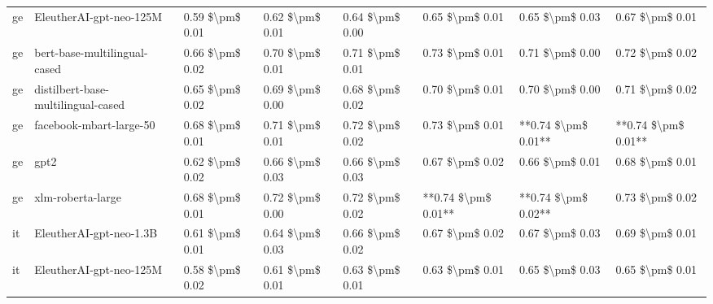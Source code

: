 \begin{tabular}{llllllll}
      ge &            EleutherAI-gpt-neo-125M & 0.59 \$\textbackslash pm\$ 0.01 &           0.62 \$\textbackslash pm\$ 0.01 &       0.64 \$\textbackslash pm\$ 0.00 &        0.65 \$\textbackslash pm\$ 0.01 &                         0.65 \$\textbackslash pm\$ 0.03 &     0.67 \$\textbackslash pm\$ 0.01 \\
      ge &       bert-base-multilingual-cased & 0.66 \$\textbackslash pm\$ 0.02 &           0.70 \$\textbackslash pm\$ 0.01 &       0.71 \$\textbackslash pm\$ 0.01 &        0.73 \$\textbackslash pm\$ 0.01 &                         0.71 \$\textbackslash pm\$ 0.00 &     0.72 \$\textbackslash pm\$ 0.02 \\
      ge & distilbert-base-multilingual-cased & 0.65 \$\textbackslash pm\$ 0.02 &           0.69 \$\textbackslash pm\$ 0.00 &       0.68 \$\textbackslash pm\$ 0.02 &        0.70 \$\textbackslash pm\$ 0.01 &                         0.70 \$\textbackslash pm\$ 0.00 &     0.71 \$\textbackslash pm\$ 0.02 \\
      ge &            facebook-mbart-large-50 & 0.68 \$\textbackslash pm\$ 0.01 &           0.71 \$\textbackslash pm\$ 0.01 &       0.72 \$\textbackslash pm\$ 0.02 &        0.73 \$\textbackslash pm\$ 0.01 &                     **0.74 \$\textbackslash pm\$ 0.01** & **0.74 \$\textbackslash pm\$ 0.01** \\
      ge &                               gpt2 & 0.62 \$\textbackslash pm\$ 0.02 &           0.66 \$\textbackslash pm\$ 0.03 &       0.66 \$\textbackslash pm\$ 0.03 &        0.67 \$\textbackslash pm\$ 0.02 &                         0.66 \$\textbackslash pm\$ 0.01 &     0.68 \$\textbackslash pm\$ 0.01 \\
      ge &                  xlm-roberta-large & 0.68 \$\textbackslash pm\$ 0.01 &           0.72 \$\textbackslash pm\$ 0.00 &       0.72 \$\textbackslash pm\$ 0.02 &    **0.74 \$\textbackslash pm\$ 0.01** &                     **0.74 \$\textbackslash pm\$ 0.02** &     0.73 \$\textbackslash pm\$ 0.02 \\
      it &            EleutherAI-gpt-neo-1.3B & 0.61 \$\textbackslash pm\$ 0.01 &           0.64 \$\textbackslash pm\$ 0.03 &       0.66 \$\textbackslash pm\$ 0.02 &        0.67 \$\textbackslash pm\$ 0.02 &                         0.67 \$\textbackslash pm\$ 0.03 &     0.69 \$\textbackslash pm\$ 0.01 \\
      it &            EleutherAI-gpt-neo-125M & 0.58 \$\textbackslash pm\$ 0.02 &           0.61 \$\textbackslash pm\$ 0.01 &       0.63 \$\textbackslash pm\$ 0.01 &        0.63 \$\textbackslash pm\$ 0.01 &                         0.65 \$\textbackslash pm\$ 0.03 &     0.65 \$\textbackslash pm\$ 0.01 \\

\end{tabular}
